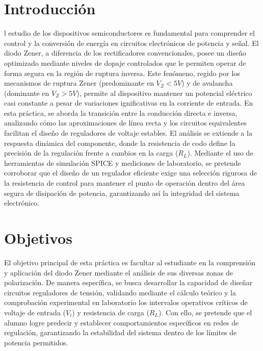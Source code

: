 \documentclass[journal]{IEEEtran}
\begin{document}
\section{Introducción}
l estudio de los dispositivos semiconductores es fundamental para comprender 
el control y la conversión de energía en circuitos electrónicos de potencia y señal.
El diodo Zener, a diferencia de los rectificadores convencionales, posee un diseño 
optimizado mediante niveles de dopaje controlados que le permiten operar de forma
segura en la región de ruptura inversa. Este fenómeno, regido por los mecanismos de
ruptura Zener (predominante en $V_Z < 5V$) y de avalancha (dominante en $V_Z > 5V$), 
permite al dispositivo mantener un potencial eléctrico casi constante a pesar de variaciones
ignificativas en la corriente de entrada. \newline \newline En esta práctica, se aborda la transición entre 
la conducción directa e inversa, analizando cómo las aproximaciones de línea recta y los circuitos equivalentes facilitan el diseño de reguladores de voltaje estables. El análisis se extiende a la respuesta dinámica del componente, donde la resistencia de codo define la precisión de la regulación frente a cambios en la carga ($R_L$). Mediante el uso de herramientas de simulación SPICE y mediciones de laboratorio, se pretende corroborar que el diseño de un regulador eficiente exige una selección rigurosa de la resistencia de control para mantener el punto de operación dentro del área segura de disipación de potencia, garantizando así la integridad del sistema electrónico.

\section{Objetivos}
El objetivo principal de esta práctica es facultar al estudiante en la comprensión y aplicación del diodo Zener mediante el análisis de sus diversas zonas de polarización. De manera específica, se busca desarrollar la capacidad de diseñar circuitos reguladores de tensión, validando mediante el cálculo teórico y la comprobación experimental en laboratorio los intervalos operativos críticos de voltaje de entrada ($V_i$) y resistencia de carga ($R_L$). Con ello, se pretende que el alumno logre predecir y establecer comportamientos específicos en redes de regulación, garantizando la estabilidad del sistema dentro de los límites de potencia permitidos.
\end{document}
